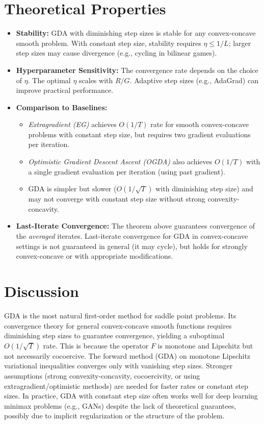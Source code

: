 \documentclass{article}
\begin{document}
\section*{Theoretical Properties}
\begin{itemize}
    \item \textbf{Stability:} GDA with diminishing step sizes is stable for any convex-concave smooth problem. With constant step size, stability requires $\eta \le 1/L$; larger step sizes may cause divergence (e.g., cycling in bilinear games).
    \item \textbf{Hyperparameter Sensitivity:} The convergence rate depends on the choice of $\eta$. The optimal $\eta$ scales with $R/G$. Adaptive step sizes (e.g., AdaGrad) can improve practical performance.
    \item \textbf{Comparison to Baselines:}
    \begin{itemize}
        \item \textit{Extragradient (EG)} achieves $O(1/T)$ rate for smooth convex-concave problems with constant step size, but requires two gradient evaluations per iteration.
        \item \textit{Optimistic Gradient Descent Ascent (OGDA)} also achieves $O(1/T)$ with a single gradient evaluation per iteration (using past gradient).
        \item GDA is simpler but slower ($O(1/\sqrt{T})$ with diminishing step size) and may not converge with constant step size without strong convexity-concavity.
    \end{itemize}
    \item \textbf{Last-Iterate Convergence:} The theorem above guarantees convergence of the \textit{averaged} iterates. Last-iterate convergence for GDA in convex-concave settings is not guaranteed in general (it may cycle), but holds for strongly convex-concave or with appropriate modifications.
\end{itemize}

\section*{Discussion}
GDA is the most natural first-order method for saddle point problems. Its convergence theory for general convex-concave smooth functions requires diminishing step sizes to guarantee convergence, yielding a suboptimal $O(1/\sqrt{T})$ rate. This is because the operator $F$ is monotone and Lipschitz but not necessarily cocoercive. The forward method (GDA) on monotone Lipschitz variational inequalities converges only with vanishing step sizes. Stronger assumptions (strong convexity-concavity, cocoercivity, or using extragradient/optimistic methods) are needed for faster rates or constant step sizes. In practice, GDA with constant step size often works well for deep learning minimax problems (e.g., GANs) despite the lack of theoretical guarantees, possibly due to implicit regularization or the structure of the problem.
\end{document}
